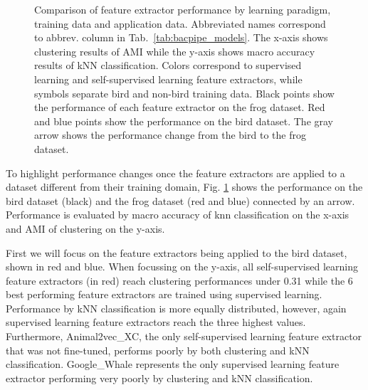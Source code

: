 \begin{figure}[ht]
    \centerline{}
    \caption{Comparison of feature extractor performance by learning paradigm, training data and application data. 
    Abbreviated names correspond to abbrev. column in Tab.~\ref{tab:bacpipe_models}. 
    The x-axis shows clustering results of AMI while the y-axis shows macro accuracy results of kNN classification. 
    Colors correspond to supervised learning and self-supervised learning feature extractors, while symbols separate bird and non-bird training data.
    Black points show the performance of each feature extractor on the frog dataset.
    Red and blue points show the performance on the bird dataset. 
    The gray arrow shows the performance change from the bird to the frog dataset.}
    \label{fig:orig_vs_ump}
\end{figure}
    

To highlight performance changes once the feature extractors are applied to a dataset different from their training domain, Fig. \ref{fig:orig_vs_ump} shows the performance on the bird dataset (black) and the frog dataset (red and blue) connected by an arrow.
Performance is evaluated by macro accuracy of knn classification on the x-axis and AMI of clustering on the y-axis.

First we will focus on the feature extractors being applied to the bird dataset, shown in red and blue.
When focussing on the y-axis, all self-supervised learning feature extractors (in red) reach clustering performances under 0.31 while the 6 best performing feature extractors are trained using supervised learning.
Performance by kNN classification is more equally distributed, however, again supervised learning feature extractors reach the three highest values.
Furthermore, Animal2vec\_XC, the only self-supervised learning feature extractor that was not fine-tuned, performs poorly by both clustering and kNN classification.
Google\_Whale represents the only supervised learning feature extractor performing very poorly by clustering and kNN classification.

